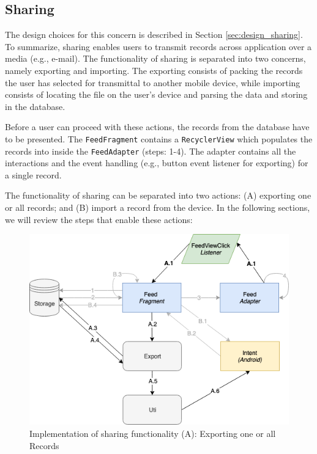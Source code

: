 \subsection{Sharing}

The design choices for this concern is described in Section \ref{sec:design_sharing}. To summarize, sharing enables users to transmit records across application over a media (e.g., e-mail). The functionality of sharing is separated into two concerns, namely exporting and importing. The exporting consists of packing the records the user has selected for transmittal to another mobile device, while importing consists of locating the file on the user's device and parsing the data and storing in the database.

Before a user can proceed with these actions, the records from the database have to be presented. The \verb|FeedFragment| contains a \verb|RecyclerView| which populates the records into inside the \verb|FeedAdapter| (steps: 1-4). The adapter contains all the interactions and the event handling (e.g., button event listener for exporting) for a single record. 

The functionality of sharing can be separated into two actions: (A) exporting one or all records; and (B) import a record from the device. In the following sections, we will review the steps that enable these actions:


\begin{figure}
    \centering
    \includegraphics[scale=0.5]{images/Sharing_ImpA.png}
    \caption{Implementation of sharing functionality (A): Exporting one or all Records}
    \label{fig:impl_sharingA}
\end{figure}

